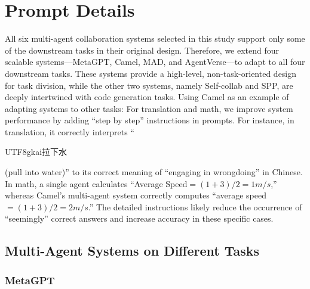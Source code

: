 \documentclass{article}
\theoremstyle{plain}
\theoremstyle{definition}
\theoremstyle{remark}
\begin{document}
\clearpage

\section{Prompt Details}

All six multi-agent collaboration systems selected in this study support only some of the downstream tasks in their original design.
Therefore, we extend four scalable systems—MetaGPT, Camel, MAD, and AgentVerse—to adapt to all four downstream tasks.
These systems provide a high-level, non-task-oriented design for task division, while the other two systems, namely Self-collab and SPP, are deeply intertwined with code generation tasks.
Using Camel as an example of adapting systems to other tasks:
For translation and math, we improve system performance by adding ``step by step'' instructions in prompts.
For instance, in translation, it correctly interprets ``\begin{CJK}{UTF8}{gkai}拉下水\end{CJK} (pull into water)'' to its correct meaning of ``engaging in wrongdoing'' in Chinese.
In math, a single agent calculates ``Average Speed$=(1+3)/2=1m/s$,'' whereas Camel's multi-agent system correctly computes ``average speed$=(1+3)/2=2m/s$.''
The detailed instructions likely reduce the occurrence of ``seemingly'' correct answers and increase accuracy in these specific cases.

\subsection{Multi-Agent Systems on Different Tasks}
\label{sec:prompt-systems}

\subsubsection{MetaGPT}
\end{document}
